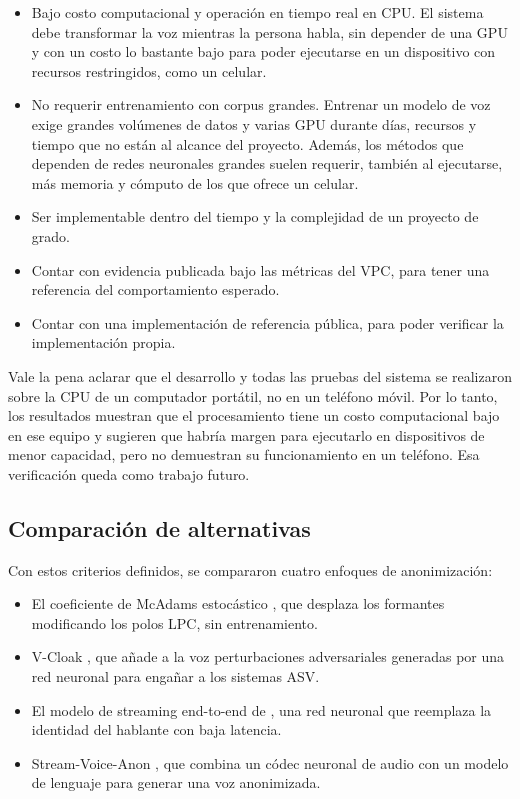 \documentclass[10pt,twocolumn]{article}
\newcommand{\textcite}[1]{\citet{#1}}
\newcommand{\parencite}[1]{\citep{#1}}
\begin{document}
\begin{itemize}
\item Bajo costo computacional y operación en tiempo real en CPU. El sistema debe transformar la voz mientras la persona habla, sin depender de una GPU y con un costo lo bastante bajo para poder ejecutarse en un dispositivo con recursos restringidos, como un celular.
\item No requerir entrenamiento con corpus grandes. Entrenar un modelo de voz exige grandes volúmenes de datos y varias GPU durante días, recursos y tiempo que no están al alcance del proyecto. Además, los métodos que dependen de redes neuronales grandes suelen requerir, también al ejecutarse, más memoria y cómputo de los que ofrece un celular.
\item Ser implementable dentro del tiempo y la complejidad de un proyecto de grado.
\item Contar con evidencia publicada bajo las métricas del VPC, para tener una referencia del comportamiento esperado.
\item Contar con una implementación de referencia pública, para poder verificar la implementación propia.
\end{itemize}

Vale la pena aclarar que el desarrollo y todas las pruebas del sistema se realizaron sobre la CPU de un computador portátil, no en un teléfono móvil. Por lo tanto, los resultados muestran que el procesamiento tiene un costo computacional bajo en ese equipo y sugieren que habría margen para ejecutarlo en dispositivos de menor capacidad, pero no demuestran su funcionamiento en un teléfono. Esa verificación queda como trabajo futuro.

\subsection{Comparación de alternativas}\label{sec:3.3}

Con estos criterios definidos, se compararon cuatro enfoques de anonimización:

\begin{itemize}
\item El coeficiente de McAdams estocástico \parencite{patino2021}, que desplaza los formantes modificando los polos LPC, sin entrenamiento.
\item V-Cloak \parencite{deng2023}, que añade a la voz perturbaciones adversariales generadas por una red neuronal para engañar a los sistemas ASV.
\item El modelo de streaming end-to-end de \textcite{quamer2024}, una red neuronal que reemplaza la identidad del hablante con baja latencia.
\item Stream-Voice-Anon \parencite{kuzmin2026}, que combina un códec neuronal de audio con un modelo de lenguaje para generar una voz anonimizada.
\end{itemize}
\end{document}
